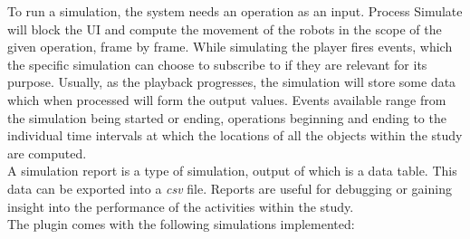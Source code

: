 To run a simulation, the system needs an operation as an input. Process Simulate will block the UI and compute the movement of the robots in the scope of the given operation, frame by frame. While simulating the player fires events, which the specific simulation can choose to subscribe to if they are relevant for its purpose. Usually, as the playback progresses, the simulation will store some data which when processed will form the output values. Events available range from the simulation being started or ending, operations beginning and ending to the individual time intervals at which the locations of all the objects within the study are computed. \\

A simulation report is a type of simulation, output of which is a data table. This data can be exported into a \emph{csv} file. Reports are useful for debugging or gaining insight into the performance of the activities within the study. \\

The plugin comes with the following simulations implemented:

